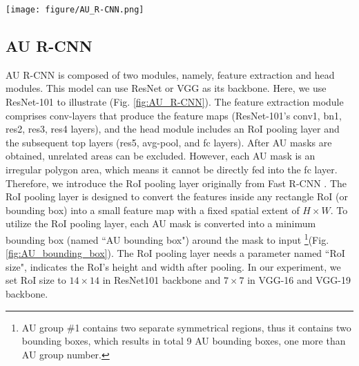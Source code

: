 \documentclass[5p,twocolumn]{elsarticle}
\begin{document}
\begin{figure*}[htbp]
	\begin{center}
		\texttt{[image: figure/AU\_R-CNN.png]}
	\end{center}
	\caption{AU R-CNN using ResNet-101 backbone architecture, where \#class denotes the AU category number we wish to discriminate.}
	\label{fig:AU_R-CNN}
	\vspace{-0.5cm}
\end{figure*}

\subsection{AU R-CNN}
\label{sec:AU_R-CNN}



AU R-CNN is composed of two modules, namely, feature extraction and head modules. This model can use ResNet \cite{he2016deep} or VGG \cite{Simonyan2014} as its backbone. Here, we use ResNet-101 to illustrate (Fig. \ref{fig:AU_R-CNN}). The feature extraction module comprises conv-layers that produce the feature maps (ResNet-101's conv1, bn1, res2, res3, res4 layers), and the head module includes an RoI pooling layer and the subsequent top layers (res5, avg-pool, and fc layers). After AU masks are obtained, unrelated areas can be excluded. However, each AU mask is an irregular polygon area, which means it cannot be directly fed into the fc layer. Therefore, we introduce the RoI pooling layer originally from Fast R-CNN \cite{girshick2015fast}. The RoI pooling layer is designed to convert the features inside any rectangle RoI (or bounding box) into a small feature map with a fixed spatial extent of $H \times W$. To utilize the RoI pooling layer, each AU mask is converted into a minimum bounding box (named ``AU bounding box") around the mask to input \footnote{AU group \#1 contains two separate symmetrical regions, thus it contains two bounding boxes, which results in total 9 AU bounding boxes, one more than AU group number.}(Fig. \ref{fig:AU_bounding_box}). The RoI pooling layer needs a parameter named ``RoI size", indicates the RoI's height and width after pooling. In our experiment, we set RoI size to $14\times 14$ in ResNet101 backbone and $7\times 7$ in VGG-16 and VGG-19 backbone. 
\end{document}
